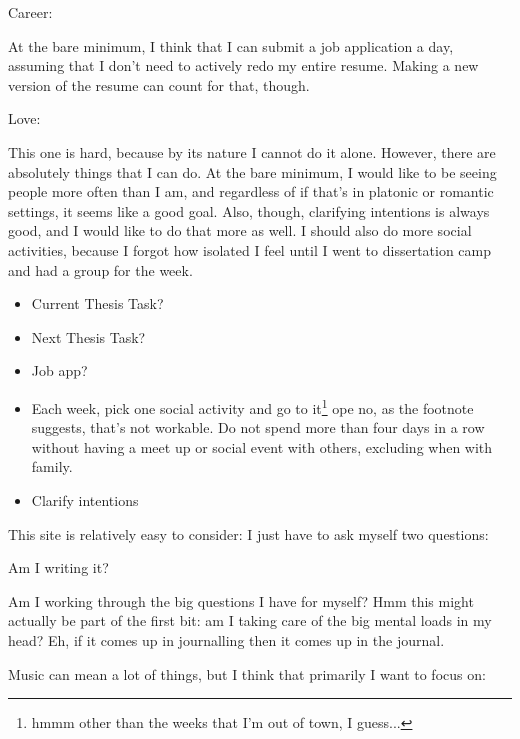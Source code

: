 \documentclass[12pt]{article}
\renewcommand{\,}{\textsuperscript{,}}
\begin{document}
Career:

At the bare minimum, I think that I can submit a job application a day, assuming that I don't need to actively redo my entire resume.  
Making a new version of the resume can count for that, though.

Love:

This one is hard, because by its nature I cannot do it alone.  
However, there are absolutely things that I can do.  
At the bare minimum, I would like to be seeing people more often than I am, and regardless of if that's in platonic or romantic settings, it seems like a good goal.  
Also, though, clarifying intentions is always good, and I would like to do that more as well.  
I should also do more social activities, because I forgot how isolated I feel until I went to dissertation camp and had a group for the week.

\begin{itemize}

\item Current Thesis Task?

\item Next Thesis Task?

\item Job app?

\item Each week, pick one social activity and go to it\footnote{hmmm other than the weeks that I'm out of town, I guess...} ope no, as the footnote suggests, that's not workable.  
Do not spend more than four days in a row without having a meet up or social event with others, excluding when with family.

\item Clarify intentions

\end{itemize}

This site is relatively easy to consider: I just have to ask myself two questions:

Am I writing it?

Am I working through the big questions I have for myself?  
Hmm this might actually be part of the first bit: am I taking care of the big mental loads in my head?  
Eh, if it comes up in journalling then it comes up in the journal.

Music can mean a lot of things, but I think that primarily I want to focus on:
\end{document}
